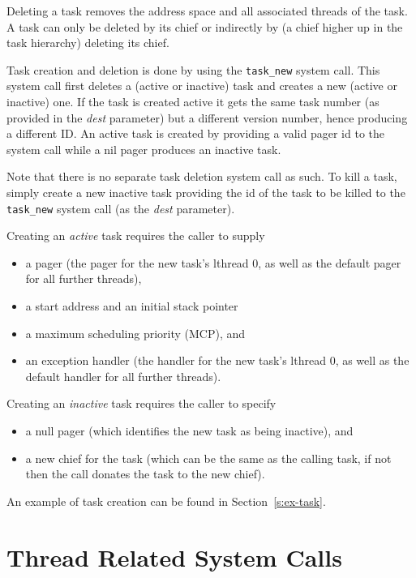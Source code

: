 Deleting a task removes the address space and all associated threads of
the task. A task can only be deleted by its chief or indirectly by (a
chief higher up in the task hierarchy) deleting its chief.

Task creation and deletion is done by using the {\footnotesize\verb+task_new+} system
call. This system call first deletes a (active or inactive) task and
creates a new (active or inactive) one. If the task is created active
it gets the same task number (as provided in the \emph{dest}
parameter) but a different version number, hence producing a different
ID. An active task is created by providing a valid pager id to the
system call while a nil pager produces an inactive task.

Note that there is no separate task deletion system call as such. To
kill a task, simply create a new inactive task providing the id of the
task to be killed to the {\footnotesize\verb+task_new+} system call (as the
\emph{dest} parameter).

Creating an \emph{active} task requires the caller to supply
\begin{itemize}
\item a pager (the pager for the new task's lthread 0, as well as the
default pager for all further threads),
\item a start address and an initial stack pointer
\item a maximum scheduling priority (MCP), and
\item an exception handler (the handler for the new task's lthread 0, as
well as the default handler for all further threads).
\end{itemize}
Creating an \emph{inactive} task requires the caller to specify
\begin{itemize}
\item a null pager (which identifies the new task as being inactive),
and
\item a new chief for the task (which can be the same as the calling
task, if not then the call donates the task to the new chief).
\end{itemize}
An example of task creation can be found in Section~\ref{s:ex-task}.


\section{Thread Related System Calls}

